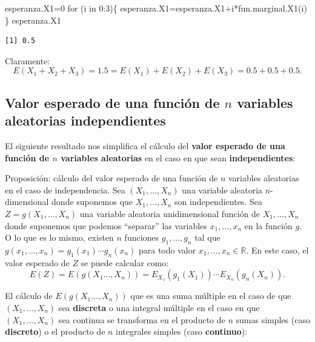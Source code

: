 \documentclass[
  letterpaper,
  DIV=11,
  numbers=noendperiod]{scrreprt}
\newenvironment{Shaded}{\begin{snugshade}}{\end{snugshade}}
\newcommand{\ControlFlowTok}[1]{\textcolor[rgb]{0.00,0.23,0.31}{#1}}
\newcommand{\DecValTok}[1]{\textcolor[rgb]{0.68,0.00,0.00}{#1}}
\newcommand{\FunctionTok}[1]{\textcolor[rgb]{0.28,0.35,0.67}{#1}}
\newcommand{\NormalTok}[1]{\textcolor[rgb]{0.00,0.23,0.31}{#1}}
\newcommand{\OtherTok}[1]{\textcolor[rgb]{0.00,0.23,0.31}{#1}}
\newcommand{\SpecialCharTok}[1]{\textcolor[rgb]{0.37,0.37,0.37}{#1}}
\begin{document}
\begin{Shaded}
\begin{Highlighting}[]
\NormalTok{esperanza.X1}\OtherTok{=}\DecValTok{0}
\ControlFlowTok{for}\NormalTok{ (i }\ControlFlowTok{in} \DecValTok{0}\SpecialCharTok{:}\DecValTok{3}\NormalTok{)\{}
\NormalTok{  esperanza.X1}\OtherTok{=}\NormalTok{esperanza.X1}\SpecialCharTok{+}\NormalTok{i}\SpecialCharTok{*}\FunctionTok{fun.marginal.X1}\NormalTok{(i)}
\NormalTok{\}}
\NormalTok{esperanza.X1}
\end{Highlighting}
\end{Shaded}

\begin{verbatim}
[1] 0.5
\end{verbatim}

Claramente: \[
E(X_1+X_2+X_3)=1.5=E(X_1)+E(X_2)+E(X_3)=0.5+0.5+0.5.
\]

\hypertarget{valor-esperado-de-una-funciuxf3n-de-n-variables-aleatorias-independientes}{%
\subsection{\texorpdfstring{Valor esperado de una función de \(n\)
variables aleatorias
independientes}{Valor esperado de una función de n variables aleatorias independientes}}\label{valor-esperado-de-una-funciuxf3n-de-n-variables-aleatorias-independientes}}

El siguiente resultado nos simplifica el cálculo del \textbf{valor
esperado de una función de \(n\) variables aleatorias} en el caso en que
sean \textbf{independientes}:

Proposición: cálculo del valor esperado de una función de \(n\)
variables aleatorias en el caso de independencia. Sea
\((X_1,\ldots,X_n)\) una variable aleatoria \(n\)-dimensional donde
suponemos que \(X_1,\ldots,X_n\) son independientes. Sea
\(Z=g(X_1,\ldots,X_n)\) una variable aleatoria unidimensional función de
\(X_1,\ldots,X_n\) donde suponemos que podemos ``separar'' las variables
\(x_1,\ldots, x_n\) en la función \(g\). O lo que es lo mismo, existen
\(n\) funciones \(g_1,\ldots, g_n\) tal que
\(g(x_1,\ldots,x_n)=g_1(x_1)\cdots g_n(x_n)\) para todo valor
\(x_1,\ldots,x_n\in\mathbb{R}\). En este caso, el valor esperado de
\(Z\) se puede calcular como: \[
E(Z)=E(g(X_1\ldots,X_n))=E_{X_1}(g_1(X_1))\cdots E_{X_n}(g_n(X_n)).
\]

El cálculo de \(E(g(X_1\ldots,X_n))\) que es una suma múltiple en el
caso de que \((X_1,\ldots,X_n)\) sea \textbf{discreta} o una integral
múltiple en el caso en que \((X_1,\ldots,X_n)\) sea continua se
transforma en el producto de \(n\) sumas simples (caso
\textbf{discreto}) o el producto de \(n\) integrales simples (caso
\textbf{continuo}):
\end{document}
